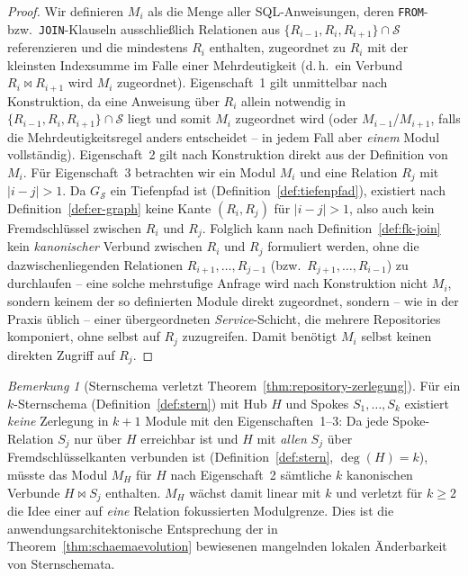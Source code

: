 ﻿\documentclass[a4paper,12pt]{report}
\theoremstyle{definition}
\theoremstyle{remark}
\newtheorem{remark}{Bemerkung}[chapter]
\begin{document}
\begin{proof}
Wir definieren $M_i$ als die Menge aller SQL-Anweisungen, deren
\texttt{FROM}- bzw.\ \texttt{JOIN}-Klauseln ausschließlich Relationen
aus $\{R_{i-1},R_i,R_{i+1}\}\cap\mathcal{S}$ referenzieren und die
mindestens $R_i$ enthalten, zugeordnet zu $R_i$ mit der kleinsten
Indexsumme im Falle einer Mehrdeutigkeit (d.\,h.\ ein Verbund
$R_i\Join R_{i+1}$ wird $M_i$ zugeordnet). Eigenschaft~1 gilt
unmittelbar nach Konstruktion, da eine Anweisung über $R_i$ allein
notwendig in $\{R_{i-1},R_i,R_{i+1}\}\cap\mathcal{S}$ liegt und somit
$M_i$ zugeordnet wird (oder $M_{i-1}$/$M_{i+1}$, falls die
Mehrdeutigkeitsregel anders entscheidet -- in jedem Fall aber
\emph{einem} Modul vollständig). Eigenschaft~2 gilt nach Konstruktion
direkt aus der Definition von $M_i$. Für Eigenschaft~3 betrachten wir
ein Modul $M_i$ und eine Relation $R_j$ mit $|i-j|>1$. Da
$G_{\mathcal{S}}$ ein Tiefenpfad ist (Definition~\ref{def:tiefenpfad}),
existiert nach Definition~\ref{def:er-graph} keine Kante
$(R_i,R_j)$ für $|i-j|>1$, also auch kein Fremdschlüssel zwischen
$R_i$ und $R_j$. Folglich kann nach
Definition~\ref{def:fk-join} kein \emph{kanonischer} Verbund zwischen
$R_i$ und $R_j$ formuliert werden, ohne die dazwischenliegenden
Relationen $R_{i+1},\ldots,R_{j-1}$ (bzw.\ $R_{j+1},\ldots,R_{i-1}$) zu
durchlaufen -- eine solche mehrstufige Anfrage wird nach Konstruktion
nicht $M_i$, sondern keinem der so definierten Module direkt
zugeordnet, sondern -- wie in der Praxis üblich -- einer
übergeordneten \emph{Service}-Schicht, die mehrere Repositories
komponiert, ohne selbst auf $R_j$ zuzugreifen. Damit benötigt $M_i$
selbst keinen direkten Zugriff auf $R_j$. \qedhere
\end{proof}

\begin{remark}[Sternschema verletzt Theorem~\ref{thm:repository-zerlegung}]
Für ein $k$-Sternschema (Definition~\ref{def:stern}) mit Hub $H$ und
Spokes $S_1,\ldots,S_k$ existiert \emph{keine} Zerlegung in $k+1$
Module mit den Eigenschaften~1--3: Da jede Spoke-Relation $S_j$ nur
über $H$ erreichbar ist und $H$ mit \emph{allen} $S_j$ über
Fremdschlüsselkanten verbunden ist (Definition~\ref{def:stern}, $\deg(H)=k$),
müsste das Modul $M_H$ für $H$ nach Eigenschaft~2 sämtliche
$k$ kanonischen Verbunde $H\Join S_j$ enthalten. $M_H$ wächst damit
linear mit $k$ und verletzt für $k\geq 2$ die Idee einer auf
\emph{eine} Relation fokussierten Modulgrenze. Dies ist die
anwendungsarchitektonische Entsprechung der in
Theorem~\ref{thm:schaemaevolution} bewiesenen mangelnden lokalen
Änderbarkeit von Sternschemata.
\end{remark}
\end{document}
